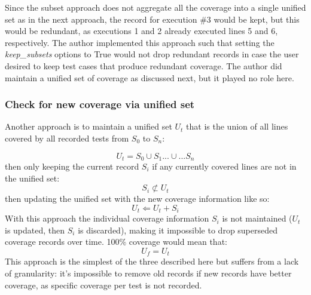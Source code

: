 \documentclass[10pt, conference]{IEEEtran}
\begin{document}
Since the subset approach does not aggregate all the coverage into a 
single unified set as in the next approach, the record for execution \#3 would
be kept, but this would be redundant, as executions 1 and 2 already executed
lines 5 and 6, respectively.
The author implemented this approach such that setting the \textit{keep\_subsets}
options to True would not drop redundant records in case the user desired to keep
test cases that produce redundant coverage. The author did maintain a unified
set of coverage as discussed next, but it played no role here.

\subsubsection{Check for new coverage via unified set}\label{sec:tuning-2}
Another approach is to maintain a unified set $U_t$ that is the union of all lines 
covered by all recorded tests from $S_0$ to $S_n$: 

\begin{equation*}
  U_t = S_0 \cup S_1 ...\cup... S_n
\end{equation*}
then only keeping the current record $S_i$ if any currently 
covered lines are not in the unified set:
\begin{equation*}
  S_i \not \subset U_t
\end{equation*}
then updating the unified set with the new coverage information like so:
\begin{equation*}
  U_t \Leftarrow U_t + S_i
\end{equation*} 
With this approach the individual coverage information $S_i$ is not maintained 
($U_t$ is updated, then $S_i$ is discarded), making it impossible to drop superseded 
coverage records over time.  100\% coverage would mean that:
\begin{equation*}
  U_f = U_t
\end{equation*} 
This approach is the simplest of the three described here but suffers from a 
lack of granularity: it's impossible to remove old records if new records have 
better coverage, as specific coverage per test is not recorded.
\end{document}
